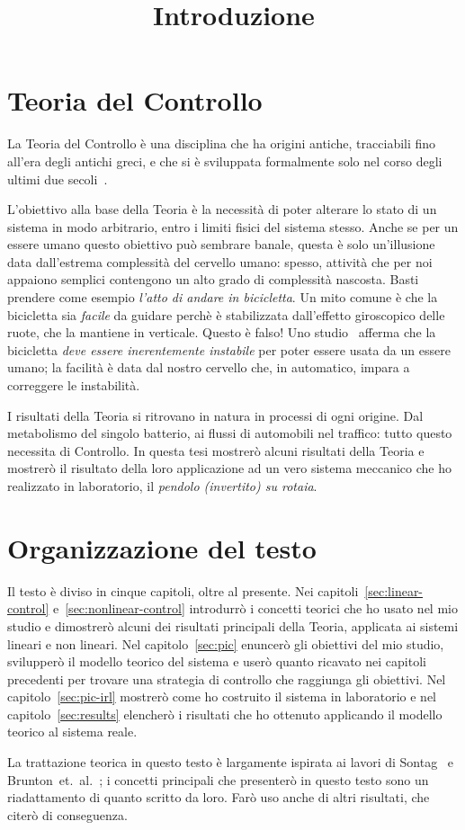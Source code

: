 
\title{Introduzione}
\maketitle
\label{sec:intro}


\section{Teoria del Controllo}
La Teoria del Controllo è una disciplina che ha origini antiche,
tracciabili fino all'era degli antichi greci,
e che si è sviluppata formalmente solo nel corso degli ultimi due secoli~\cite{history}.

L'obiettivo alla base della Teoria è la necessità di poter alterare
lo stato di un sistema in modo arbitrario, entro i limiti fisici
del sistema stesso.
Anche se per un essere umano questo obiettivo può sembrare banale,
questa è solo un'illusione data dall'estrema complessità del cervello umano:
spesso, attività che per noi appaiono semplici contengono un
alto grado di complessità nascosta.
Basti prendere come esempio \emph{l'atto di andare in bicicletta}.
Un mito comune è che la bicicletta sia \emph{facile} da guidare perchè
è stabilizzata dall'effetto giroscopico delle ruote, che la mantiene in verticale.
Questo è falso!
Uno studio~\cite{bicycle}
afferma che la bicicletta \emph{deve essere inerentemente instabile} per poter
essere usata da un essere umano; la facilità è data dal nostro cervello che,
in automatico, impara a correggere le instabilità.

I risultati della Teoria si ritrovano in natura in processi di ogni origine.
Dal metabolismo del singolo batterio, ai flussi di automobili nel traffico:
tutto questo necessita di Controllo.
In questa tesi mostrerò alcuni risultati della Teoria e
mostrerò il risultato della loro applicazione ad un vero sistema
meccanico che ho realizzato in laboratorio, il \emph{pendolo (invertito) su rotaia}.

\section{Organizzazione del testo}
Il testo è diviso in cinque capitoli, oltre al presente.
Nei capitoli~\ref{sec:linear-control} e~\ref{sec:nonlinear-control} introdurrò
i concetti teorici che ho usato nel mio studio e dimostrerò alcuni dei risultati
principali della Teoria, applicata ai sistemi lineari e non lineari.
Nel capitolo~\ref{sec:pic} enuncerò gli obiettivi del mio studio, svilupperò il modello
teorico del sistema e userò quanto ricavato nei capitoli
precedenti per trovare una strategia di controllo che raggiunga gli obiettivi.
Nel capitolo~\ref{sec:pic-irl} mostrerò come ho costruito il sistema in laboratorio
e nel capitolo~\ref{sec:results} elencherò i risultati che ho ottenuto applicando
il modello teorico al sistema reale.

La trattazione teorica in questo testo è largamente ispirata ai lavori di
Sontag~\cite{sontagMath} e Brunton~et.~al.~\cite{brunton_kutz_2019};
i concetti principali che presenterò in questo testo
sono un riadattamento di quanto scritto da loro.
Farò uso anche di altri risultati, che citerò di conseguenza.